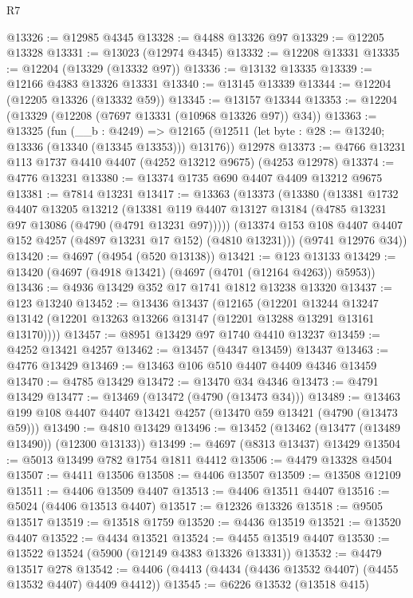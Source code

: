 \begin{lexlean}{R7}
\begin{coremodule}
@13326 := @12985 @4345
@13328 := @4488 @13326 @97
@13329 := @12205 @13328
@13331 := @13023 (@12974 @4345)
@13332 := @12208 @13331
@13335 := @12204 (@13329 (@13332 @97))
@13336 := @13132 @13335
@13339 := @12166 @4383 @13326 @13331
@13340 := @13145 @13339
@13344 := @12204 (@12205 @13326 (@13332 @59))
@13345 := @13157 @13344
@13353 := @12204 (@13329 (@12208 (@7697 @13331 (@10968 @13326 @97)) @34))
@13363 := @13325
    (fun (__b : @4249) =>
    @12165 (@12511 (let byte : @28 := @13240; @13336 (@13340 (@13345 @13353))) @13176))
    @12978
@13373 := @4766 @13231 @113 @1737 @4410 @4407 (@4252 @13212 @9675) (@4253 @12978)
@13374 := @4776 @13231
@13380 := @13374 @1735 @690 @4407 @4409 @13212 @9675
@13381 := @7814 @13231
@13417 := @13363
    (@13373
      (@13380
        (@13381
          @1732
          @4407
          @13205
          @13212
          (@13381 @119 @4407 @13127 @13184 (@4785 @13231 @97 @13086 (@4790 (@4791 @13231 @97)))))
        (@13374 @153 @108 @4407 @4407 @152 @4257 (@4897 @13231 @17 @152) (@4810 @13231)))
      (@9741 @12976 @34))
@13420 := @4697 (@4954 (@520 @13138))
@13421 := @123 @13133
@13429 := @13420 (@4697 (@4918 @13421) (@4697 (@4701 (@12164 @4263)) @5953))
@13436 := @4936 @13429 @352 @17 @1741 @1812 @13238 @13320
@13437 := @123 @13240
@13452 := @13436
    @13437
    (@12165
      (@12201
        @13244
        @13247
        @13142
        (@12201 @13263 @13266 @13147 (@12201 @13288 @13291 @13161 @13170))))
@13457 := @8951 @13429 @97 @1740 @4410 @13237
@13459 := @4252 @13421 @4257
@13462 := @13457 (@4347 @13459) @13437
@13463 := @4776 @13429
@13469 := @13463 @106 @510 @4407 @4409 @4346 @13459
@13470 := @4785 @13429
@13472 := @13470 @34 @4346
@13473 := @4791 @13429
@13477 := @13469 (@13472 (@4790 (@13473 @34)))
@13489 := @13463 @199 @108 @4407 @4407 @13421 @4257 (@13470 @59 @13421 (@4790 (@13473 @59)))
@13490 := @4810 @13429
@13496 := @13452 (@13462 (@13477 (@13489 @13490)) (@12300 @13133))
@13499 := @4697 (@8313 @13437) @13429
@13504 := @5013 @13499 @782 @1754 @1811 @4412
@13506 := @4479 @13328 @4504
@13507 := @4411 @13506
@13508 := @4406 @13507
@13509 := @13508 @12109
@13511 := @4406 @13509 @4407
@13513 := @4406 @13511 @4407
@13516 := @5024 (@4406 @13513 @4407)
@13517 := @12326 @13326
@13518 := @9505 @13517
@13519 := @13518 @1759
@13520 := @4436 @13519
@13521 := @13520 @4407
@13522 := @4434 @13521
@13524 := @4455 @13519 @4407
@13530 := @13522 @13524 (@5900 (@12149 @4383 @13326 @13331))
@13532 := @4479 @13517 @278
@13542 := @4406 (@4413 (@4434 (@4436 @13532 @4407) (@4455 @13532 @4407) @4409 @4412))
@13545 := @6226 @13532 (@13518 @415)

\end{coremodule}
\end{lexlean}
